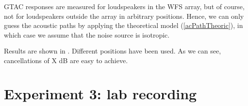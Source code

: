 GTAC responses are measured for loudspeakers in the WFS array, but of course, not for loudspeakers outside the array in arbitrary positions. Hence, we can only guess the acoustic paths by applying the theoretical model (\autoref{acPathTheoric}), in which case we assume that the noise source is isotropic.

Results are shown in . Different positions have been used. As we can see, cancellations of X dB are easy to achieve.



\section{Experiment 3: lab recording}
